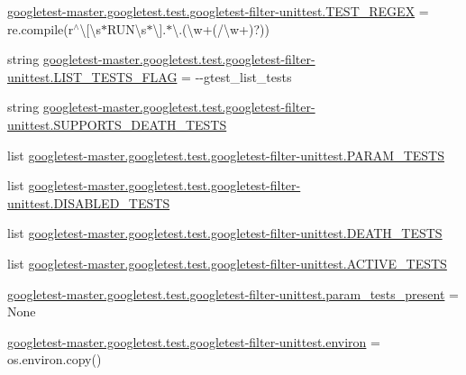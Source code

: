 \begin{DoxyCompactItemize}
\item 
\mbox{\hyperlink{namespacegoogletest-master_1_1googletest_1_1test_1_1googletest-filter-unittest_afae3d624b711bb171ab37cf2ae206ccc}{googletest-\/master.\+googletest.\+test.\+googletest-\/filter-\/unittest.\+T\+E\+S\+T\+\_\+\+R\+E\+G\+EX}} = re.\+compile(r\textquotesingle{}$^\wedge$\textbackslash{}\mbox{[}\textbackslash{}s$\ast$R\+U\+N\textbackslash{}s$\ast$\textbackslash{}\mbox{]}.$\ast$\textbackslash{}.(\textbackslash{}w+(/\textbackslash{}w+)?)\textquotesingle{})
\item 
string \mbox{\hyperlink{namespacegoogletest-master_1_1googletest_1_1test_1_1googletest-filter-unittest_abca567a79ea0368ba10161b0cd426cab}{googletest-\/master.\+googletest.\+test.\+googletest-\/filter-\/unittest.\+L\+I\+S\+T\+\_\+\+T\+E\+S\+T\+S\+\_\+\+F\+L\+AG}} = \textquotesingle{}-\/-\/gtest\+\_\+list\+\_\+tests\textquotesingle{}
\item 
string \mbox{\hyperlink{namespacegoogletest-master_1_1googletest_1_1test_1_1googletest-filter-unittest_a38f2f2e1d3958035cd559c5dba78ffad}{googletest-\/master.\+googletest.\+test.\+googletest-\/filter-\/unittest.\+S\+U\+P\+P\+O\+R\+T\+S\+\_\+\+D\+E\+A\+T\+H\+\_\+\+T\+E\+S\+TS}}
\item 
list \mbox{\hyperlink{namespacegoogletest-master_1_1googletest_1_1test_1_1googletest-filter-unittest_a1e3164ba7871d214cbfe3bfddf5815da}{googletest-\/master.\+googletest.\+test.\+googletest-\/filter-\/unittest.\+P\+A\+R\+A\+M\+\_\+\+T\+E\+S\+TS}}
\item 
list \mbox{\hyperlink{namespacegoogletest-master_1_1googletest_1_1test_1_1googletest-filter-unittest_aa77df40d5f0ad8d817412633fe4923ed}{googletest-\/master.\+googletest.\+test.\+googletest-\/filter-\/unittest.\+D\+I\+S\+A\+B\+L\+E\+D\+\_\+\+T\+E\+S\+TS}}
\item 
list \mbox{\hyperlink{namespacegoogletest-master_1_1googletest_1_1test_1_1googletest-filter-unittest_a16efc2ca10f7224cf90ae15c06b540ef}{googletest-\/master.\+googletest.\+test.\+googletest-\/filter-\/unittest.\+D\+E\+A\+T\+H\+\_\+\+T\+E\+S\+TS}}
\item 
list \mbox{\hyperlink{namespacegoogletest-master_1_1googletest_1_1test_1_1googletest-filter-unittest_af9e7b6d973a455400b01e578f546a0b9}{googletest-\/master.\+googletest.\+test.\+googletest-\/filter-\/unittest.\+A\+C\+T\+I\+V\+E\+\_\+\+T\+E\+S\+TS}}
\item 
\mbox{\hyperlink{namespacegoogletest-master_1_1googletest_1_1test_1_1googletest-filter-unittest_af37d07e585b1b93ff6aef6ee6c39e682}{googletest-\/master.\+googletest.\+test.\+googletest-\/filter-\/unittest.\+param\+\_\+tests\+\_\+present}} = None
\item 
\mbox{\hyperlink{namespacegoogletest-master_1_1googletest_1_1test_1_1googletest-filter-unittest_a1c47d007a4a6d573965940a6fbb8fe54}{googletest-\/master.\+googletest.\+test.\+googletest-\/filter-\/unittest.\+environ}} = os.\+environ.\+copy()
\end{DoxyCompactItemize}
